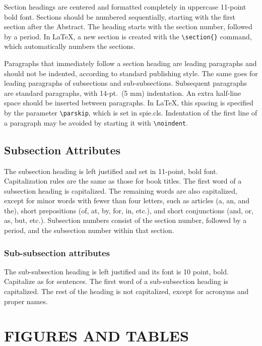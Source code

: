 \documentclass[]{spie}  %
\begin{document}
Section headings are centered and formatted completely in uppercase 11-point bold font.  Sections should be numbered sequentially, starting with the first section after the Abstract.  The heading starts with the section number, followed by a period.  In LaTeX, a new section is created with the \verb|\section{}| command, which automatically numbers the sections.

Paragraphs that immediately follow a section heading are leading paragraphs and should not be indented, according to standard publishing style\cite{Lamport94}.  The same goes for leading paragraphs of subsections and sub-subsections.  Subsequent paragraphs are standard paragraphs, with 14-pt.\ (5 mm) indentation.  An extra half-line space should be inserted between paragraphs.  In LaTeX, this spacing is specified by the parameter \verb|\parskip|, which is set in {\ttfamily spie.cls}.  Indentation of the first line of a paragraph may be avoided by starting it with \verb|\noindent|.
 
\subsection{Subsection Attributes}

The subsection heading is left justified and set in 11-point, bold font.  Capitalization rules are the same as those for book titles.  The first word of a subsection heading is capitalized.  The remaining words are also capitalized, except for minor words with fewer than four letters, such as articles (a, an, and the), short prepositions (of, at, by, for, in, etc.), and short conjunctions (and, or, as, but, etc.).  Subsection numbers consist of the section number, followed by a period, and the subsection number within that section.  

\subsubsection{Sub-subsection attributes}
The sub-subsection heading is left justified and its font is 10 point, bold.  Capitalize as for sentences.  The first word of a sub-subsection heading is capitalized.  The rest of the heading is not capitalized, except for acronyms and proper names.  

\section{FIGURES AND TABLES}
\end{document}
